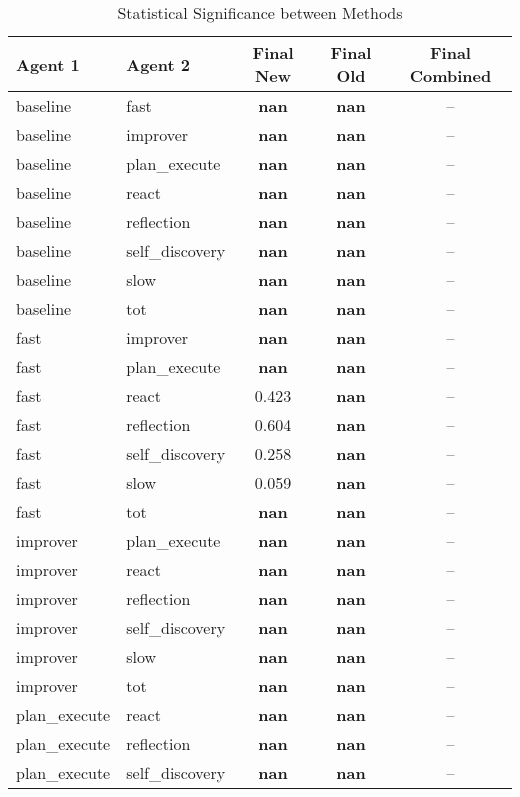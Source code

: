 \begin{table}[htbp]
\centering
\caption{Statistical Significance between Methods}
\label{tab:significance}
\begin{tabular}{llccc}
\toprule
Agent 1 & Agent 2 & Final New & Final Old & Final Combined \\
\midrule
baseline & fast & \textbf{nan} & \textbf{nan} & -- \\
baseline & improver & \textbf{nan} & \textbf{nan} & -- \\
baseline & plan_execute & \textbf{nan} & \textbf{nan} & -- \\
baseline & react & \textbf{nan} & \textbf{nan} & -- \\
baseline & reflection & \textbf{nan} & \textbf{nan} & -- \\
baseline & self_discovery & \textbf{nan} & \textbf{nan} & -- \\
baseline & slow & \textbf{nan} & \textbf{nan} & -- \\
baseline & tot & \textbf{nan} & \textbf{nan} & -- \\
fast & improver & \textbf{nan} & \textbf{nan} & -- \\
fast & plan_execute & \textbf{nan} & \textbf{nan} & -- \\
fast & react & 0.423 & \textbf{nan} & -- \\
fast & reflection & 0.604 & \textbf{nan} & -- \\
fast & self_discovery & 0.258 & \textbf{nan} & -- \\
fast & slow & 0.059 & \textbf{nan} & -- \\
fast & tot & \textbf{nan} & \textbf{nan} & -- \\
improver & plan_execute & \textbf{nan} & \textbf{nan} & -- \\
improver & react & \textbf{nan} & \textbf{nan} & -- \\
improver & reflection & \textbf{nan} & \textbf{nan} & -- \\
improver & self_discovery & \textbf{nan} & \textbf{nan} & -- \\
improver & slow & \textbf{nan} & \textbf{nan} & -- \\
improver & tot & \textbf{nan} & \textbf{nan} & -- \\
plan_execute & react & \textbf{nan} & \textbf{nan} & -- \\
plan_execute & reflection & \textbf{nan} & \textbf{nan} & -- \\
plan_execute & self_discovery & \textbf{nan} & \textbf{nan} & -- \\

\end{tabular}
\end{table}
